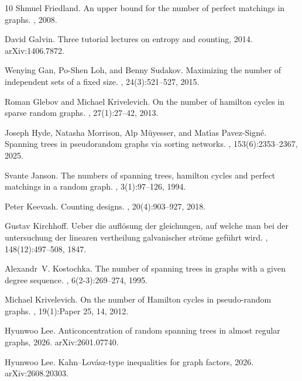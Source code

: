 \documentclass[reqno,final,a4paper]{amsart}
\numberwithin{equation}{section}
\theoremstyle{definition}
\theoremstyle{remark}
\begin{document}
\begin{thebibliography}{10}
Shmuel Friedland.
\newblock An upper bound for the number of perfect matchings in graphs.
, 2008.

David Galvin.
\newblock Three tutorial lectures on entropy and counting, 2014.
\newblock arXiv:1406.7872.

Wenying Gan, Po-Shen Loh, and Benny Sudakov.
\newblock Maximizing the number of independent sets of a fixed size.
, 24(3):521--527, 2015.

Roman Glebov and Michael Krivelevich.
\newblock On the number of hamilton cycles in sparse random graphs.
, 27(1):27--42, 2013.

Joseph Hyde, Natasha Morrison, Alp M\"{u}yesser, and Mat\'{\i}as Pavez-Sign\'{e}.
\newblock Spanning trees in pseudorandom graphs via sorting networks.
, 153(6):2353--2367, 2025.

Svante Janson.
\newblock The numbers of spanning trees, hamilton cycles and perfect matchings in a random graph.
, 3(1):97--126, 1994.

Peter Keevash.
\newblock Counting designs.
, 20(4):903--927, 2018.

Gustav Kirchhoff.
\newblock Ueber die aufl{\"o}sung der gleichungen, auf welche man bei der untersuchung der linearen vertheilung galvanischer str{\"o}me gef{\"u}hrt wird.
, 148(12):497--508, 1847.

Alexandr~V. Kostochka.
\newblock The number of spanning trees in graphs with a given degree sequence.
, 6(2-3):269--274, 1995.

Michael Krivelevich.
\newblock On the number of {H}amilton cycles in pseudo-random graphs.
, 19(1):Paper 25, 14, 2012.

Hyunwoo Lee.
\newblock Anticoncentration of random spanning trees in almost regular graphs, 2026.
\newblock arXiv:2601.07740.

Hyunwoo Lee.
\newblock Kahn--{Lov{\'a}sz}-type inequalities for graph factors, 2026.
\newblock arXiv:2608.20303.


\end{thebibliography}
\end{document}

